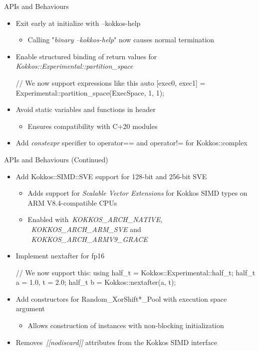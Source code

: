 \begin{frame}[fragile]{APIs and Behaviours}
 \begin{itemize}
  \item Exit early at initialize with --kokkos-help
    \begin{itemize}
      \item Calling "\emph{binary} \emph{{--}kokkos-help}" now causes normal termination
    \end{itemize}
  \item Enable structured binding of return values for \emph{Kokkos::Experimental::partition\_space}
        \begin{code}[keywords={std}]
          // We now support expressions like this
          auto [exec0, exec1] = 
                  Experimental::partition_space(ExecSpace, 1, 1);
        \end{code}
    \item Avoid static variables and functions in header
    \begin{itemize}
      \item  Ensures compatibility with C+20 modules
      \end{itemize}
    \item Add \emph{constexpr} specifier to operator== and operator!= for Kokkos::complex

 \end{itemize}
\end{frame}

\begin{frame}[fragile]{APIs and Behaviours (Continued)}
 \begin{itemize}
     \item Add Kokkos::SIMD::SVE support for 128-bit and 256-bit SVE 
     \begin{itemize}
      \item Adds support for \emph{Scalable Vector Extensions} for Kokkos SIMD types on ARM V8.4-compatible CPUs
      \item Enabled with~\emph{KOKKOS\_ARCH\_NATIVE}, ~\emph{KOKKOS\_ARCH\_ARM\_SVE} and
 ~\emph{KOKKOS\_ARCH\_ARMV9\_GRACE}
     \end{itemize}
     \item Implement nextafter for fp16
        \begin{code}[keywords={std}]
          // We now support this:
          using half_t = Kokkos::Experimental::half_t;
          half_t a = 1.0, t = 2.0;
          half_t b = Kokkos::nextafter(a, t);
        \end{code}
     \item Add constructors for Random\_XorShift*\_Pool with execution space argument
      \begin{itemize}
      \item Allows construction of instances with non-blocking initialization
    \end{itemize}
     \item Removes~\emph{[[nodiscard]]} attributes from the Kokkos SIMD interface
 \end{itemize}
\end{frame}



